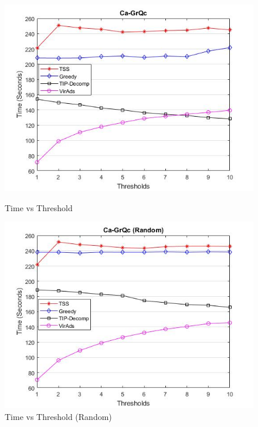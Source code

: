 \begin{figure}[h!]
\begin{minipage}[t]{0.50\textwidth}
\includegraphics[width=\linewidth,keepaspectratio=true]{images/ca-grqctime.jpg}
\caption{Time vs Threshold}

\end{minipage}
\begin{minipage}[t]{0.50\textwidth}
\includegraphics[width=\linewidth,keepaspectratio=true]{images/ca-grqcrandomtime.jpg}
\caption{Time vs Threshold (Random)}
\end{minipage}
\end{figure}


